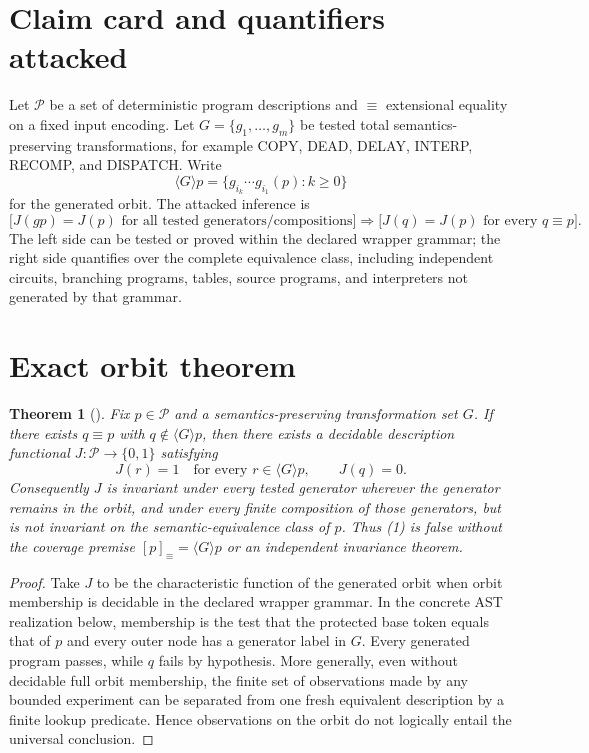 \documentclass[11pt]{article}
\newtheorem{theorem}{Theorem}
\newcommand{\claim}[1]{\texttt{\detokenize{#1}}}
\begin{document}
\section{Claim card and quantifiers attacked}
Let $\mathcal P$ be a set of deterministic program descriptions and
$\equiv$ extensional equality on a fixed input encoding.  Let
$G=\{g_1,\ldots,g_m\}$ be tested total semantics-preserving transformations,
for example COPY, DEAD, DELAY, INTERP, RECOMP, and DISPATCH.  Write
\[
 \langle G\rangle p
 =\{g_{i_k}\cdots g_{i_1}(p):k\ge0\}
\]
for the generated orbit.  The attacked inference is
\[
 \bigl[J(gp)=J(p)\text{ for all tested generators/compositions}\bigr]
 \Longrightarrow
 \bigl[J(q)=J(p)\text{ for every }q\equiv p\bigr].              \tag{1}
\]
The left side can be tested or proved within the declared wrapper grammar;
the right side quantifies over the complete equivalence class, including
independent circuits, branching programs, tables, source programs, and
interpreters not generated by that grammar.

\section{Exact orbit theorem}
\begin{theorem}[\claim{TESTED-WRAPPER-MONOID-NONCERTIFICATION1}]
Fix $p\in\mathcal P$ and a semantics-preserving transformation set $G$.  If
there exists $q\equiv p$ with $q\notin\langle G\rangle p$, then there exists a
decidable description functional $J:\mathcal P\to\{0,1\}$ satisfying
\[
 J(r)=1\quad\text{for every }r\in\langle G\rangle p,
 \qquad J(q)=0.
\]
Consequently $J$ is invariant under every tested generator wherever the
generator remains in the orbit, and under every finite composition of those
generators, but is not invariant on the semantic-equivalence class of $p$.
Thus (1) is false without the coverage premise
$[p]_{\equiv}=\langle G\rangle p$ or an independent invariance theorem.
\end{theorem}

\begin{proof}
Take $J$ to be the characteristic function of the generated orbit when orbit
membership is decidable in the declared wrapper grammar.  In the concrete
AST realization below, membership is the test that the protected base token
equals that of $p$ and every outer node has a generator label in $G$.
Every generated program passes, while $q$ fails by hypothesis.  More
generally, even without decidable full orbit membership, the finite set of
observations made by any bounded experiment can be separated from one fresh
equivalent description by a finite lookup predicate.  Hence observations on
the orbit do not logically entail the universal conclusion.
\end{proof}
\end{document}
